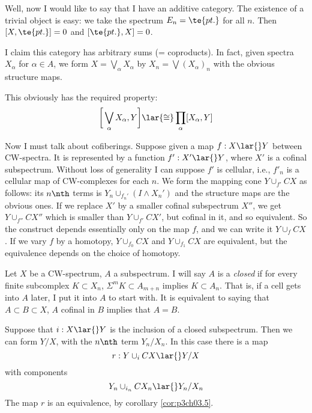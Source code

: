 \documentclass[../main]{subfiles}
\begin{document}
Well, now I would like to say that I have an additive category. The
existence of a trivial object is easy: we take the spectrum $E_n=\te{pt.}$ for all $n$. Then $[X,\te{pt.}]=0$ and $[\te{pt.},X]=0 $.

I claim this category has arbitrary sums (= coproducts). In fact,
given spectra $X_\alpha$ for $\alpha\in A$, we form $X=\bigvee_\alpha X_\alpha$ by $X_n=\bigvee (X_\alpha)_n$ with the obvious structure maps.


This obviously has the required property:
\[\bigg[\bigvee_\alpha X_\alpha,Y\bigg] \lar{\cong} \prod_\alpha [X_\alpha,Y] \]

Now I must talk about cofiberings. Suppose given a map $f:X\lar{}Y$ between CW-spectra. It is represented by a function $f':X'\lar{}Y$, where $X'$ is a cofinal subspectrum. Without loss of generality I can suppose $f'$ is cellular, i.e., $f'_n$ is a cellular map of CW-complexes for each $n$. We form the mapping cone $Y\cup_{f'} CX$ as follows: its $n\nth$ terms is $Y_n \cup_{f_n'} (I\wedge X_n')$ and the structure maps are the obvious ones. If we replace $X'$ by a smaller cofinal subspectrum $X''$, we get $Y\cup_{f''} CX''$ which is smaller than $Y\cup_{f'} CX'$, but cofinal in it, and so equivalent. So the construct depends essentially only on the map $f$, and we can write it $Y\cup_f CX$. If we vary $f$ by a homotopy, $Y\cup_{f_0} CX$ and $Y\cup_{f_1} CX$ are equivalent, but the equivalence depends on the choice of homotopy.

Let $X$ be a CW-spectrum, $A$ a subspectrum. I will say $A$ is a \emph{closed}  if for every finite subcomplex $K\subset X_n$, $\Sigma^mK\subset A_{m+n}$ implies $K\subset A_n$. That is, if a cell gets into $A$ later, I put it into $A$ to start with. It is equivalent to saying that $A\subset B\subset X$, $A$ cofinal in $B$ implies that $A=B$.

Suppose that $i:X\lar{}Y$ is the inclusion of a closed subspectrum. Then we can form $Y/X$, with the $n\nth$ term $Y_n/X_n$. In this case there is a map \[r:Y\cup_i CX\lar{} Y/X \]
with components \[Y_n\cup_{i_n} CX_n \lar{} Y_n/X_n \]
The map $r$ is an equivalence, by corollary \ref{cor:p3ch03.5}.
\end{document}
